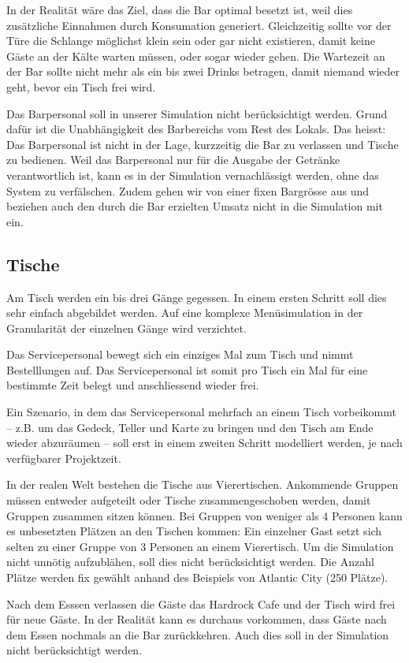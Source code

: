 \documentclass[ngerman,a4paper,12pt]{scrreprt}
\begin{document}
In der Realität wäre das Ziel, dass die Bar optimal besetzt ist, weil dies zusätzliche Einnahmen durch Konsumation generiert. Gleichzeitig sollte vor der Türe die Schlange möglichst klein sein oder gar nicht existieren, damit keine Gäste an der Kälte warten müssen, oder sogar wieder gehen. Die Wartezeit an der Bar sollte nicht mehr als ein bis zwei Drinks betragen, damit niemand wieder geht, bevor ein Tisch frei wird.

Das Barpersonal soll in unserer Simulation nicht berücksichtigt werden. Grund dafür ist die Unabhängigkeit des Barbereichs vom Rest des Lokals. Das heisst: Das Barpersonal ist nicht in der Lage, kurzzeitig die Bar zu verlassen und Tische zu bedienen. Weil das Barpersonal nur für die Ausgabe der Getränke verantwortlich ist, kann es in der Simulation vernachlässigt werden, ohne das System zu verfälschen. Zudem gehen wir von einer fixen Bargrösse aus und beziehen auch den durch die Bar erzielten Umsatz nicht in die Simulation mit ein.

\subsection{Tische}
Am Tisch werden ein bis drei Gänge gegessen. In einem ersten Schritt soll dies sehr einfach abgebildet werden. Auf eine komplexe Menüsimulation in der Granularität der einzelnen Gänge wird verzichtet.

Das Servicepersonal bewegt sich ein einziges Mal zum Tisch und nimmt Bestelllungen auf. Das Servicepersonal ist somit pro Tisch ein Mal für eine bestimmte Zeit belegt und anschliessend wieder frei.

Ein Szenario, in dem das Servicepersonal mehrfach an einem Tisch vorbeikommt -- z.B. um das Gedeck, Teller und Karte zu bringen und den Tisch am Ende wieder abzuräumen -- soll erst in einem zweiten Schritt modelliert werden, je nach verfügbarer Projektzeit.

In der realen Welt bestehen die Tische aus Vierertischen. Ankommende Gruppen müssen entweder aufgeteilt oder Tische zusammengeschoben werden, damit Gruppen zusammen sitzen können. Bei Gruppen von weniger als 4 Personen kann es unbesetzten Plätzen an den Tischen kommen: Ein einzelner Gast setzt sich selten zu einer Gruppe von 3 Personen an einem Vierertisch. Um die Simulation nicht unnötig aufzublähen, soll dies nicht berücksichtigt werden.
Die Anzahl Plätze werden fix gewählt anhand des Beispiels von Atlantic City (250 Plätze).

Nach dem Esssen  verlassen die Gäste das Hardrock Cafe und der Tisch wird frei für neue Gäste.
In der Realität kann es durchaus vorkommen, dass Gäste nach dem Essen nochmals an die Bar zurückkehren. Auch dies soll in der Simulation nicht berücksichtigt werden.
\end{document}
